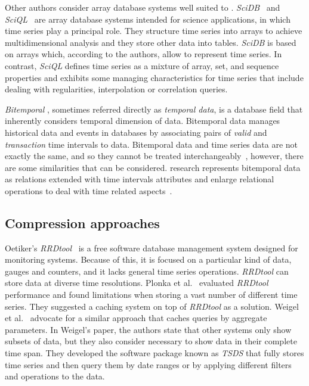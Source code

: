 Other authors consider array database systems well suited to
.  \emph{SciDB}~\cite{stonebraker09:scidb} and
\emph{SciQL}~\cite{zhang11} are array database systems intended for
science applications, in which time series play a principal role. They
structure time series into arrays to achieve multidimensional analysis
and they store other data into tables.  \emph{SciDB} is based on
arrays which, according to the authors, allow to represent time
series.  In contrast, \emph{SciQL} defines time series as a mixture of
array, set, and sequence properties and exhibits some managing
characteristics for time series that include dealing with regularities,
interpolation or correlation queries.

\emph{Bitemporal} , sometimes referred directly as
\emph{temporal data}, is a database field that inherently considers
temporal dimension of data. Bitemporal data manages historical data
and events in databases by associating pairs of \emph{valid} and
\emph{transaction} time intervals to data.  Bitemporal data and time
series data are not exactly the same, and so they cannot be treated
interchangeably~\cite{schmidt95}, however, there are some similarities
that can be considered.  research represents bitemporal
data as relations extended with time intervals attributes and enlarge
relational operations to deal with time related
aspects~\cite{jensen99:temporaldata,date02:_tempor_data_relat_model}.


\subsection{Compression approaches}

Oetiker's \emph{RRDtool}~\cite{rrdtool,lisa98:oetiker} is a free
software database management system designed for monitoring
systems. Because of this, it is focused on a particular kind of data,
gauges and counters, and it lacks general time series
operations. \emph{RRDtool} can store data at diverse time
resolutions. Plonka et al.~\cite{lisa07:plonka} evaluated
\emph{RRDtool} performance and found limitations when storing a vast
number of different time series. They suggested a caching system on
top of \emph{RRDtool} as a solution. Weigel et al.~\cite{weigel10}
advocate for a similar approach that caches queries by aggregate
parameters.  In Weigel's paper, the authors state that other systems
only show subsets of data, but they also consider necessary to show
data in their complete time span. They developed the software package
known as \emph{TSDS} that fully stores time series and then query them
by date ranges or by applying different filters and operations to the
data.

